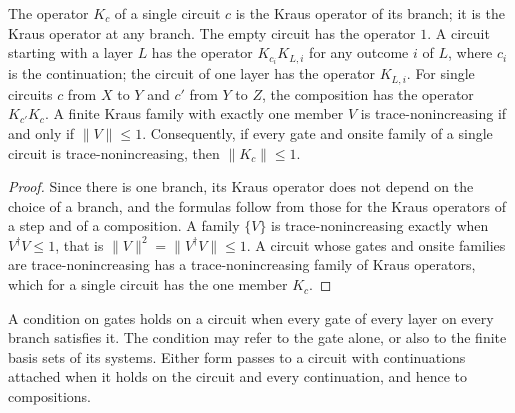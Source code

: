 \begin{theorem}
    \label{thm:circuits_single_op}
    \leanok
    The operator $K_c$ of a single circuit $c$ is the Kraus operator of its branch; it is
    the Kraus operator at any branch. The empty circuit has the operator $1$. A circuit
    starting with a layer $L$ has the operator $K_{c_i}K_{L,i}$ for any outcome $i$ of $L$,
    where $c_i$ is the continuation; the circuit of one layer has the operator $K_{L,i}$.
    For single circuits $c$ from $X$ to $Y$ and $c'$ from $Y$ to $Z$, the composition has
    the operator $K_{c'}K_c$. A finite Kraus family with exactly one member $V$ is
    trace-nonincreasing if and only if $\lVert V\rVert\le1$. Consequently, if every gate and
    onsite family of a single circuit is trace-nonincreasing, then $\lVert K_c\rVert\le1$.
\end{theorem}
\begin{proof}\leanok
    Since there is one branch, its Kraus operator does not depend on the choice of a
    branch, and the formulas follow from those for the Kraus operators of a step and of a
    composition. A family $\{V\}$ is trace-nonincreasing exactly when $V^\dagger V\le1$,
    that is $\lVert V\rVert^2=\lVert V^\dagger V\rVert\le1$. A circuit whose gates and
    onsite families are trace-nonincreasing has a trace-nonincreasing family of Kraus
    operators, which for a single circuit has the one member $K_c$.
\end{proof}

\begin{definition}
    \label{def:circuits_forall_gate}
    \leanok
    A condition on gates holds on a circuit when every gate of every layer on every branch
    satisfies it. The condition may refer to the gate alone, or also to the finite basis
    sets of its systems. Either form passes to a circuit with continuations attached when
    it holds on the circuit and every continuation, and hence to compositions.
\end{definition}


